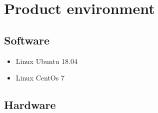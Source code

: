 \section{Product environment}
\subsection{Software}
\begin{itemize}
\item Linux Ubuntu 18.04
\item Linux CentOs 7
\end{itemize}

\subsection{Hardware}
